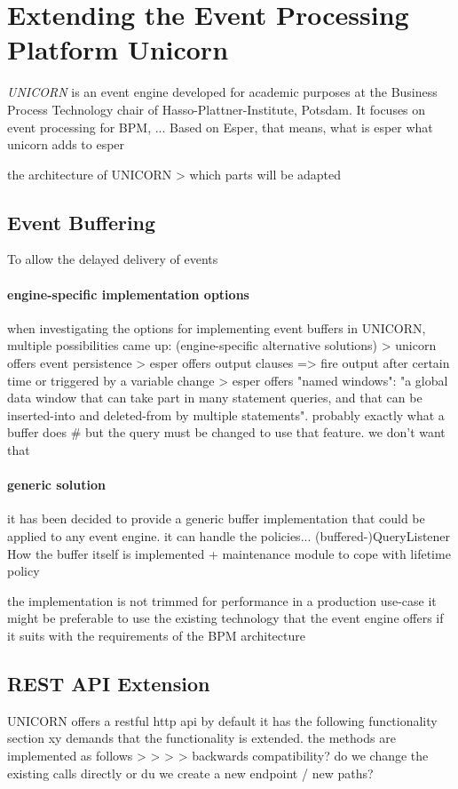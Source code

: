 \section{Extending the Event Processing Platform Unicorn}\label{ch:implunicorn}
\textit{UNICORN} is an event engine developed for academic purposes at the Business Process Technology chair of Hasso-Plattner-Institute, Potsdam.
\cite{herzberg2013event}
It focuses on event processing for \acs{BPM}, ...
Based on Esper, that means, what is esper
what unicorn adds to esper

the architecture of UNICORN
> which parts will be adapted

\subsection{Event Buffering}
To allow the delayed delivery of events 

\paragraph{engine-specific implementation options}
when investigating the options for implementing event buffers in UNICORN, multiple possibilities came up:
(engine-specific alternative solutions)
> unicorn offers event persistence
> esper offers output clauses => fire output after certain time or triggered by a variable change
> esper offers "named windows": "a global data window that can take part in many statement queries, and that can be inserted-into and deleted-from by multiple statements". probably exactly what a buffer does
\# but the query must be changed to use that feature. we don't want that

\paragraph{generic solution}
it has been decided to provide a generic buffer implementation that could be applied to any event engine.
it can handle the policies...
(buffered-)QueryListener
How the buffer itself is implemented
+ maintenance module to cope with lifetime policy

the implementation is not trimmed for performance
in a production use-case it might be preferable to use the existing technology that the event engine offers if it suits with the requirements of the BPM architecture


\subsection{REST API Extension}
UNICORN offers a restful http api
by default it has the following functionality
section xy demands that the functionality is extended.
the methods are implemented as follows
>
>
>
>
backwards compatibility? do we change the existing calls directly or du we create a new endpoint / new paths?


